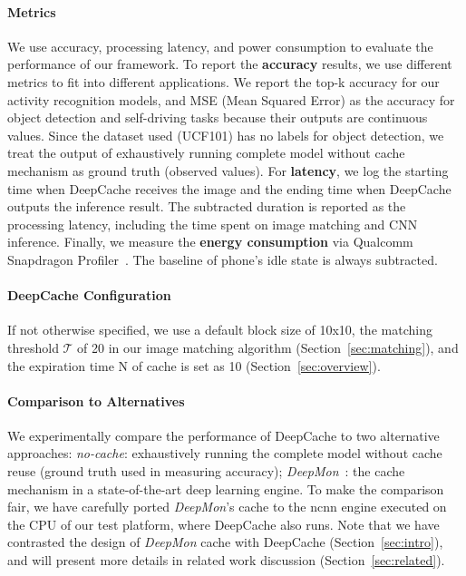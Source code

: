 \documentclass[10pt,acmtog]{acmart}
\newcommand{\framework}{DeepCache\xspace}
\newcommand{\sys}{\framework{}}
\begin{document}
\paragraph{Metrics}
We use accuracy, processing latency, and power consumption to evaluate the performance of our framework.
To report the \textbf{accuracy} results, we use different metrics to fit into different applications.
We report the top-k accuracy for our activity recognition models, and MSE (Mean Squared Error) as the accuracy for object detection and self-driving tasks because their outputs are continuous values.
Since the dataset used (UCF101) has no labels for object detection, we treat the output of exhaustively running complete model without cache mechanism as ground truth (observed values).
For \textbf{latency}, we log the starting time when \framework receives the image and the ending time when \framework outputs the inference result.
The subtracted duration is reported as the processing latency, including the time spent on image matching and CNN inference.
Finally, we measure the \textbf{energy consumption} via Qualcomm Snapdragon Profiler~\cite{SnapdragonProfiler}.
The baseline of phone's idle state is always subtracted.

\paragraph{\framework Configuration}
If not otherwise specified, we use a default block size of 10x10, the matching threshold $\mathcal{T}$ of 20 in our image matching algorithm (Section~\ref{sec:matching}), and the expiration time N of cache is set as 10 (Section~\ref{sec:overview}).

\paragraph{Comparison to Alternatives}
We experimentally compare the performance of \framework to two alternative approaches: \emph{no-cache}: exhaustively running the complete model without cache reuse (ground truth used in measuring accuracy); 
\emph{DeepMon}~\cite{conf/mobisys/LocLB17}:
the cache mechanism in a state-of-the-art deep learning engine.
To make the comparison fair, we have carefully ported \emph{DeepMon}'s cache to the ncnn engine executed on the CPU of our test platform, where \sys{} also runs. 
Note that we have contrasted the design of \emph{DeepMon} cache with \sys{} (Section~\ref{sec:intro}), and will present more details in related work discussion (Section~\ref{sec:related}).
\end{document}
